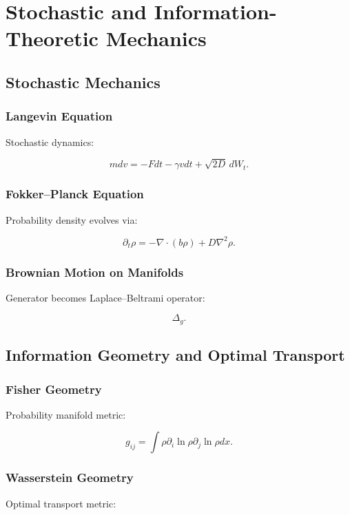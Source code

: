 \documentclass[11pt]{book}
\begin{document}
\part{Stochastic and Information-Theoretic Mechanics}

\chapter{Stochastic Mechanics}

\section{Langevin Equation}

Stochastic dynamics:

\[
mdv
=
-Fdt
-\gamma vdt
+\sqrt{2D}\,dW_t.
\]

\section{Fokker--Planck Equation}

Probability density evolves via:

\[
\partial_t\rho
=
-\nabla\cdot(b\rho)
+
D\nabla^2\rho.
\]

\section{Brownian Motion on Manifolds}

Generator becomes Laplace--Beltrami operator:

\[
\Delta_g.
\]

\chapter{Information Geometry and Optimal Transport}

\section{Fisher Geometry}

Probability manifold metric:

\[
g_{ij}
=
\int
\rho
\partial_i\ln\rho
\partial_j\ln\rho
 dx.
\]

\section{Wasserstein Geometry}

Optimal transport metric:
\end{document}
